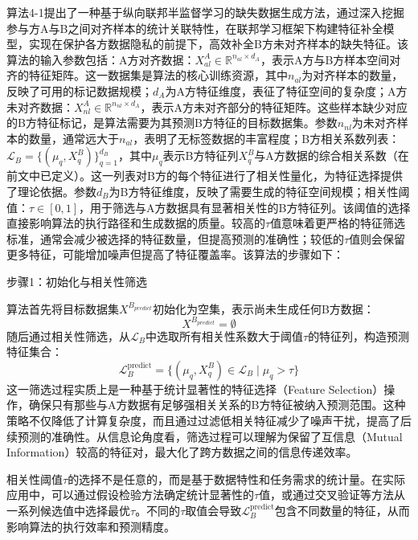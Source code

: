 算法4-1提出了一种基于纵向联邦半监督学习的缺失数据生成方法，通过深入挖掘参与方A与B之间对齐样本的统计关联特性，在联邦学习框架下构建特征补全模型，实现在保护各方数据隐私的前提下，高效补全B方未对齐样本的缺失特征。该算法的输入参数包括：A方对齐数据：$X_{al}^A \in \mathbb{R}^{n_{al} \times d_A}$，表示A方与B方样本空间对齐的特征矩阵。这一数据集是算法的核心训练资源，其中$n_{al}$为对齐样本的数量，反映了可用的标记数据规模；$d_A$为A方特征维度，表征了特征空间的复杂度；A方未对齐数据：$X_{nl}^A \in \mathbb{R}^{n_{nl} \times d_A}$，表示A方未对齐部分的特征矩阵。这些样本缺少对应的B方特征标记，是算法需要为其预测B方特征的目标数据集。参数$n_{nl}$为未对齐样本的数量，通常远大于$n_{al}$，表明了无标签数据的丰富程度；B方相关系数列表：$\mathcal{L}_B = \{(\mu_q, X^B_q)\}_{q=1}^{d_B}$，其中$\mu_q$表示B方特征列$X^B_q$与A方数据的综合相关系数（在前文中已定义）。这一列表对B方的每个特征进行了相关性量化，为特征选择提供了理论依据。参数$d_B$为B方特征维度，反映了需要生成的特征空间规模；相关性阈值：$\tau \in [0, 1]$，用于筛选与A方数据具有显著相关性的B方特征列。该阈值的选择直接影响算法的执行路径和生成数据的质量。较高的$\tau$值意味着更严格的特征筛选标准，通常会减少被选择的特征数量，但提高预测的准确性；较低的$\tau$值则会保留更多特征，可能增加噪声但提高了特征覆盖率。该算法的步骤如下：

步骤1：初始化与相关性筛选

算法首先将目标数据集$X^{B_{predict}}$初始化为空集，表示尚未生成任何B方数据：
\begin{equation}
	X^{B_{predict}} = \emptyset
\end{equation}
随后通过相关性筛选，从$\mathcal{L}_B$中选取所有相关性系数大于阈值$\tau$的特征列，构造预测特征集合：
\begin{equation}
	\mathcal{L}_B^{\text{predict}} = \{(\mu_q, X^B_q) \in \mathcal{L}_B \mid \mu_q > \tau\}
\end{equation}
这一筛选过程实质上是一种基于统计显著性的特征选择（Feature Selection）操作，确保只有那些与A方数据有足够强相关关系的B方特征被纳入预测范围。这种策略不仅降低了计算复杂度，而且通过过滤低相关特征减少了噪声干扰，提高了后续预测的准确性。从信息论角度看，筛选过程可以理解为保留了互信息（Mutual Information）较高的特征对，最大化了跨方数据之间的信息传递效率。

相关性阈值$\tau$的选择不是任意的，而是基于数据特性和任务需求的统计量。在实际应用中，可以通过假设检验方法确定统计显著性的$\tau$值，或通过交叉验证等方法从一系列候选值中选择最优$\tau$。不同的$\tau$取值会导致$\mathcal{L}_B^{\text{predict}}$包含不同数量的特征，从而影响算法的执行效率和预测精度。

